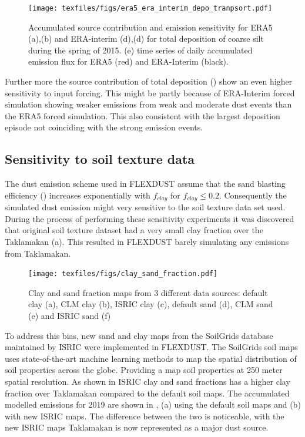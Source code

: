 \begin{figure}[htbp]
    \centering
    \texttt{[image: texfiles/figs/era5\_era\_interim\_depo\_tranpsort.pdf]}
    \caption{Accumulated source contribution and emission sensitivity for ERA5 (a),(b) and ERA-interim (d),(d) for total deposition of coarse silt during the spring of 2015. (e) time series of daily accumulated emission fl{}ux for ERA5 (red) and ERA-Interim (black).}
    \label{fig:era5_era_interim_source}
\end{figure}

Further more the source contribution of total deposition () show an even higher sensitivity to input forcing. This might be partly because of ERA-Interim forced simulation showing weaker emissions from weak and moderate dust events than the ERA5 forced simulation. 
This also consistent with the largest deposition episode not coinciding with the strong emission events.
\subsection{Sensitivity to soil texture data}\label{sec:sens_soil}
The dust emission scheme used in FLEXDUST assume that the sand blasting efficiency () increases exponentially with $f_{clay}$ for $f_{clay} \leq 0.2$. Consequently the simulated dust emission might very sensitive to the soil texture data set used.
During the process of performing these sensitivity experiments it was discovered that original soil texture dataset had a very small clay fraction over the Taklamakan (a). This resulted in FLEXDUST barely simulating any emissions from Taklamakan.

\begin{figure}[hptb]
    \centering
    \texttt{[image: texfiles/figs/clay\_sand\_fraction.pdf]}
    \caption{Clay and sand fraction maps from 3 different data sources: default clay (a), CLM clay (b), ISRIC clay (c), default sand (d), CLM sand (e) and ISRIC sand (f)}
    \label{fig:clay_sand_fraction_comparison}
\end{figure}

To address this bias, new sand and clay maps from the SoilGrids database maintained by ISRIC were implemented in FLEXDUST. The SoilGrids soil maps uses state-of-the-art machine learning methods to map the spatial distribution of soil properties across the globe. Providing a map soil properties at 250 meter spatial resolution. As shown in  ISRIC clay and sand fractions has a higher clay fraction over Taklamakan compared to the default soil maps. The accumulated modelled emissions for 2019 are shown in , (a) using the default soil maps and (b) with new ISRIC maps. The difference between the two is noticeable, with the new ISRIC maps Taklamakan is now represented as a major dust source.

